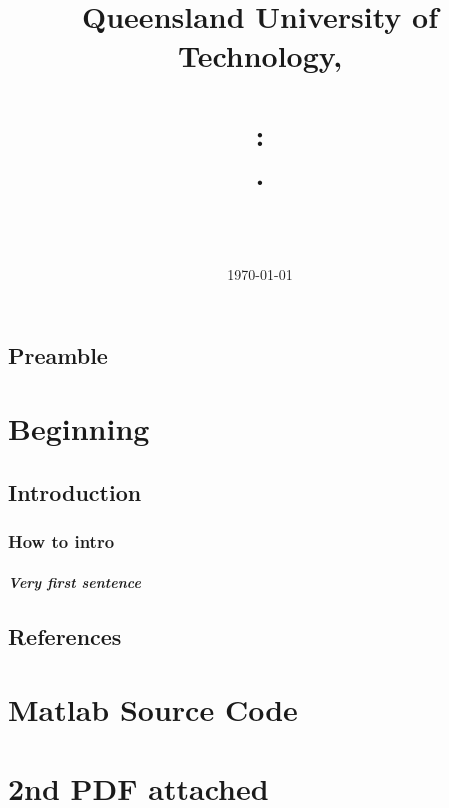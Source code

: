 \documentclass[english]{report}
\title{ Queensland University of Technology, \subjectCode \\ \HRule{1 pt} \\ \AssignmentNum : \\ \taskName.
\HRule{2.0pt} \\ [0.6cm]}
\author{\textbf{\myname} \\ \\ \mySTDNum }
\date{\today} %
\begin{document}
\maketitle
\pagestyle{fancy}
\tableofcontents %
\newpage
\section*{Preamble}

\chapter{Beginning} %

\section{Introduction} %
\subsection{How to intro}

\paragraph{Very first sentence }


\newpage
\section*{References}
\printbibliography[heading=none] %

\appendix
\chapter{Matlab Source Code}

\chapter{2nd PDF attached}
\end{document}
